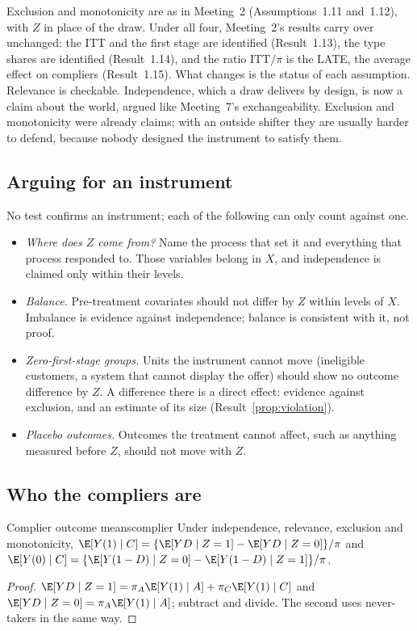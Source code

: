 \documentclass[11pt]{article}
\begin{document}
Exclusion and monotonicity are as in Meeting~2 (Assumptions~1.11 and~1.12), with $Z$ in place of the draw. Under all four,
Meeting~2's results carry over unchanged: the ITT and the first stage are identified (Result~1.13), the type shares are
identified (Result~1.14), and the ratio $\text{ITT}/\pi$ is the LATE, the average effect on compliers (Result~1.15). What
changes is the status of each assumption. Relevance is checkable. Independence, which a draw delivers by design, is now a
claim about the world, argued like Meeting~7's exchangeability. Exclusion and monotonicity were already claims; with an
outside shifter they are usually harder to defend, because nobody designed the instrument to satisfy them.

\subsection{Arguing for an instrument}

No test confirms an instrument; each of the following can only count against one.
\begin{itemize}
  \item \emph{Where does $Z$ come from?} Name the process that set it and everything that process responded to. Those
  variables belong in $X$, and independence is claimed only within their levels.
  \item \emph{Balance.} Pre-treatment covariates should not differ by $Z$ within levels of $X$. Imbalance is evidence against
  independence; balance is consistent with it, not proof.
  \item \emph{Zero-first-stage groups.} Units the instrument cannot move (ineligible customers, a system that cannot display
  the offer) should show no outcome difference by $Z$. A difference there is a direct effect: evidence against exclusion,
  and an estimate of its size (Result~\ref{prop:violation}).
  \item \emph{Placebo outcomes.} Outcomes the treatment cannot affect, such as anything measured before $Z$, should not move with $Z$.
\end{itemize}

\subsection{Who the compliers are}

\begin{prop}{Complier outcome means}{complier}
Under independence, relevance, exclusion and monotonicity,
$\E[Y(1) \mid C] = \{\E[YD \mid Z=1] - \E[YD \mid Z=0]\}/\pi$ and $\E[Y(0) \mid C] = \{\E[Y(1-D) \mid Z=0] - \E[Y(1-D) \mid Z=1]\}/\pi$.
\end{prop}
\begin{proof}
$\E[YD \mid Z=1] = \pi_A\E[Y(1) \mid A] + \pi_C\E[Y(1) \mid C]$ and $\E[YD \mid Z=0] = \pi_A\E[Y(1) \mid A]$; subtract and divide. The second uses
never-takers in the same way.
\end{proof}
\end{document}

